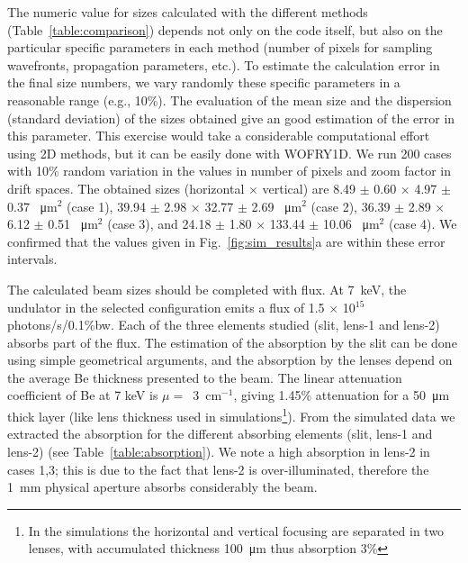 \documentclass{iucr}              %
\begin{document}
The numeric value for sizes calculated with the different methods (Table~\ref{table:comparison}) depends not only on the code itself, but also on the particular specific parameters in each method (number of pixels for sampling wavefronts, propagation parameters, etc.). To estimate the calculation error in the final size numbers, we vary randomly these specific parameters in a reasonable range (e.g., 10\%). The evaluation of the mean size and the dispersion (standard deviation) of the sizes obtained give an good estimation of the error in this parameter. This exercise would take a considerable computational effort using 2D methods, but it can be easily done with WOFRY1D. We run 200 cases with 10\% random variation in the values in number of pixels and zoom factor in drift spaces. The obtained sizes (horizontal $\times$ vertical) are  
8.49 $\pm$ 0.60 $\times$ 4.97 $\pm$ 0.37 \SI{}{\micro\meter}$^2$ (case 1),
39.94 $\pm$ 2.98 $\times$ 32.77 $\pm$ 2.69 \SI{}{\micro\meter}$^2$ (case 2),
36.39 $\pm$ 2.89 $\times$ 6.12 $\pm$ 0.51 \SI{}{\micro\meter}$^2$ (case 3), and
24.18 $\pm$ 1.80 $\times$ 133.44 $\pm$ 10.06 \SI{}{\micro\meter}$^2$ (case 4). We confirmed that the values given in Fig.~\ref{fig:sim_results}a are within these error intervals.

The calculated beam sizes should be completed with flux. At \SI{7}{keV}, the undulator in the selected configuration emits a flux of 1.5 $\times$ 10$^{15}$ photons/s/0.1\%bw. Each of the three elements studied (slit, lens-1 and lens-2) absorbs part of the flux. The estimation of the absorption by the slit can be done using simple geometrical arguments, and the absorption by the lenses depend on the average Be thickness presented to the beam. The linear attenuation coefficient of Be at 7 keV is $\mu=$~\SI{3}{\centi\meter}$^{-1}$, giving 1.45\% attenuation for a \SI{50}{\micro\meter} thick layer (like lens thickness used in simulations\footnote{In the simulations the horizontal and vertical focusing are separated in two lenses, with accumulated thickness \SI{100}{\micro\meter} thus absorption 3\%}). 
From the simulated data we extracted the absorption for the different absorbing elements (slit, lens-1 and lens-2) (see Table~\ref{table:absorption}).
We note a high absorption in lens-2 in cases 1,3; this is due to the fact that lens-2 is over-illuminated, therefore the \SI{1}{\milli\meter} physical aperture absorbs considerably the beam.
\end{document}
